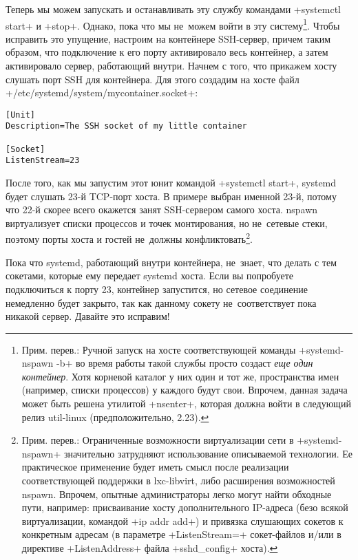 \documentclass[10pt,oneside,a4paper]{article}
\begin{document}
Теперь мы можем запускать и останавливать эту службу командами +systemctl start+
и +stop+. Однако, пока что мы не~можем войти в эту систему\footnote{Прим.
перев.: Ручной запуск на хосте соответствующей команды +systemd-nspawn -b+ во
время работы такой службы просто создаст \emph{еще один контейнер}. Хотя
корневой каталог у них один и тот же, пространства имен (например, списки
процессов) у каждого будут свои. Впрочем, данная задача может быть решена
утилитой +nsenter+, которая должна войти в следующий релиз util-linux
(предположительно, 2.23).}. Чтобы исправить это упущение, настроим на контейнере
SSH-сервер, причем таким образом, что подключение к его порту активировало весь
контейнер, а затем активировало сервер, работающий внутри. Начнем с того, что
прикажем хосту слушать порт SSH для контейнера. Для этого создадим на хосте файл
+/etc/systemd/system/mycontainer.socket+:
\begin{Verbatim}
[Unit]
Description=The SSH socket of my little container

[Socket]
ListenStream=23
\end{Verbatim}

После того, как мы запустим этот юнит командой +systemctl start+, systemd будет
слушать 23-й TCP-порт хоста. В примере выбран именной 23-й, потому что 22-й
скорее всего окажется занят SSH-сервером самого хоста. nspawn виртуализует
списки процессов и точек монтирования, но не~сетевые стеки, поэтому порты хоста
и гостей не~должны конфликтовать\footnote{Прим. перев.: Ограниченные возможности
виртуализации сети в +systemd-nspawn+ значительно затрудняют использование
описываемой технологии. Ее практическое применение будет иметь смысл после
реализации соответствующей поддержки в lxc-libvirt, либо расширения возможностей
nspawn. Впрочем, опытные администраторы легко могут найти обходные пути,
например: присваивание хосту дополнительного IP-адреса (безо всякой
виртуализации, командой +ip addr add+) и привязка слушающих сокетов к конкретным
адресам (в параметре +ListenStream=+ сокет-файлов и/или в директиве
+ListenAddress+ файла +sshd_config+ хоста).}. 

Пока что systemd, работающий внутри контейнера, не~знает, что делать с тем
сокетами, которые ему передает systemd хоста. Если вы попробуете подключиться к
порту 23, контейнер запустится, но сетевое соединение немедленно будет закрыто,
так как данному сокету не~соответствует пока никакой сервер. Давайте это
исправим!
\end{document}
